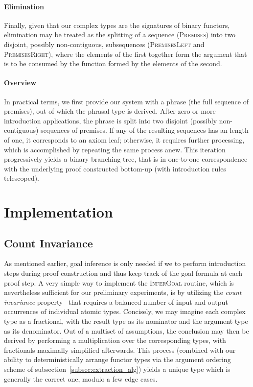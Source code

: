 \paragraph{Elimination}
Finally, given that our complex types are the signatures of binary functors, elimination may be treated as the splitting of a sequence (\textsc{Premises}) into two disjoint, possibly non-contiguous, subsequences (\textsc{PremisesLeft} and \textsc{PremisesRight}), where the elements of the first together form the argument that is to be consumed by the function formed by the elements of the second.

\paragraph{Overview}
In practical terms, we first provide our system with a phrase (the full sequence of premises), out of which the phrasal type is derived.
After zero or more introduction applications, the phrase is split into two disjoint (possibly non-contiguous) sequences of premises.
If any of the resulting sequences has an length of one, it corresponds to an axiom leaf; otherwise, it requires further processing, which is accomplished by repeating the same process anew.
This iteration progressively yields a binary branching tree, that is in one-to-one correspondence with the underlying proof constructed bottom-up (with introduction rules telescoped).

\section{Implementation}
\subsection{Count Invariance}
As mentioned earlier, goal inference is only needed if we to perform introduction steps during proof construction and thus keep track of the goal formula at each proof step.
A very simple way to implement the \textsc{InferGoal} routine, which is nevertheless sufficient for our preliminary experiments, is by utilizing the  \emph{count invariance} property~\cite{DBLP:journals/jphil/Benthem91} that requires a balanced number of input and output occurrences of individual atomic types.
Concisely, we may imagine each complex type as a fractional, with the result type as its nominator and the argument type as its denominator.
Out of a multiset of assumptions, the conclusion may then be derived by performing a multiplication over the corresponding types, with fractionals maximally simplified afterwards.
This process (combined with our ability to deterministically arrange functor types via the argument ordering scheme of subsection~\ref{subsec:extraction_alg}) yields a unique type which is generally the correct one, modulo a few edge cases.

